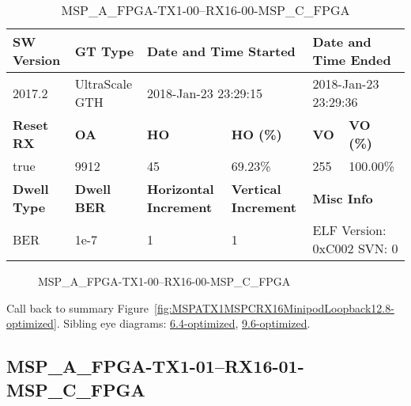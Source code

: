 \begin{table}[h]
\centering
\caption{MSP\_A\_FPGA-TX1-00--RX16-00-MSP\_C\_FPGA}
\label{tab:MSPAFPGATX100RX1600MSPCFPGA12.8-optimized}
\begin{tabular}{@{}|l|l|l|l|l|l|@{}}
\toprule
\textbf{SW Version}                & \textbf{GT Type}   & \multicolumn{2}{l|}{\textbf{Date and Time Started}}            & \multicolumn{2}{l|}{\textbf{Date and Time Ended}}        \\ \midrule
2017.2                       & UltraScale GTH          & \multicolumn{2}{l|}{2018-Jan-23 23:29:15}                   & \multicolumn{2}{l|}{2018-Jan-23 23:29:36}               \\ \midrule
\textbf{Reset RX}                  & \textbf{OA} & \textbf{HO}   & \textbf{HO (\%)} & \textbf{VO} & \textbf{VO (\%)} \\ \midrule
true & 9912        & 45          & 69.23\%        & 255        & 100.00\%       \\ \midrule
\textbf{Dwell Type}                & \textbf{Dwell BER} & \textbf{Horizontal Increment} & \textbf{Vertical Increment}    & \multicolumn{2}{l|}{\textbf{Misc Info}}                  \\ \midrule
BER                            & 1e-7        & 1        & 1           & \multicolumn{2}{l|}{ELF Version: 0xC002 SVN: 0}                         \\ \bottomrule
\end{tabular}
\end{table}

\begin{figure}[h]
\caption{MSP\_A\_FPGA-TX1-00--RX16-00-MSP\_C\_FPGA} \label{fig:MSPAFPGATX100RX1600MSPCFPGA12.8-optimized}
\end{figure}

Call back to summary Figure~\ref{fig:MSPATX1MSPCRX16MinipodLoopback12.8-optimized}.
Sibling eye diagrams: \hyperref[sec:MSPAFPGATX100RX1600MSPCFPGA6.4-optimized]{6.4-optimized}, \hyperref[sec:MSPAFPGATX100RX1600MSPCFPGA9.6-optimized]{9.6-optimized}.

\clearpage
\newpage


\subsection{MSP\_A\_FPGA-TX1-01--RX16-01-MSP\_C\_FPGA}\label{sec:MSPAFPGATX101RX1601MSPCFPGA12.8-optimized}

